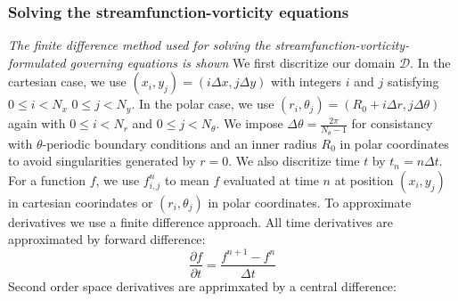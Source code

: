\documentclass{article}
\begin{document}
\subsubsection*{Solving the streamfunction-vorticity equations}
{\it{The finite difference method used for solving the streamfunction-vorticity-formulated governing equations is shown}}
\vspace{0.3cm}
\newline
\noindent We first discritize our domain $\mathcal{D}$. In the cartesian case, we use $(x_i,y_j)=(i \Delta x, j \Delta y)
$ with integers $i$ and $j$ satisfying $0\leq i < N_x$ $0 \leq j < N_y$. In the polar case, we use $(r_i, \theta_j)= (R_0 
+ i \Delta r, j 
\Delta \theta)$ again with  $0 \leq i < N_r$ and $0 \leq j < N_{\theta}$. We impose $\Delta \theta = \frac{2 \pi}
{N_{\theta} - 1}$ for consistancy with $\theta$-periodic boundary conditions and an inner radius $R_0$ in polar 
coordinates to avoid 
singularities generated by $r=0$. We also discritize time $t$ by $t_n = n \Delta t$. For a function $f$, we use 
$f^n_{i,j}$ to mean $f$ evaluated at time $n$ at position $(x_i,y_j)$ in cartesian coorindates or $(r_i, \theta_j)$ in 
polar coordinates. 
\newline
To approximate derivatives we use a finite difference approach. All time derivatives are approximated by forward difference:
\begin{equation}
	\frac{\partial f}{\partial t} = \frac{f^{n+1} - f^{n}}{\Delta t}
	\label{forward time difference}
\end{equation}
Second order space derivatives are apprimxated by a central difference:
\end{document}
